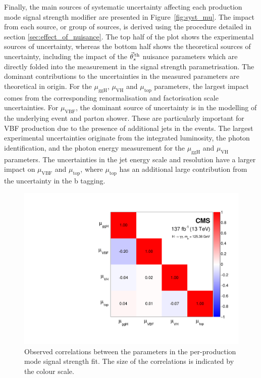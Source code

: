 Finally, the main sources of systematic uncertainty affecting each production mode signal strength modifier are presented in Figure~\ref{fig:syst_mu}. The impact from each source, or group of sources, is derived using the procedure detailed in section \ref{sec:effect_of_nuisance}. The top half of the plot shows the experimental sources of uncertainty, whereas the bottom half shows the theoretical sources of uncertainty, including the impact of the $\vec{\theta}^{\,\rm{th}}_{s}$ nuisance parameters which are directly folded into the measurement in the signal strength parametrisation. The dominant contributions to the uncertainties in the measured parameters are theoretical in origin. For the $\mu_{\text{ggH}}$, $\mu_{\text{VH}}$ and $\mu_{\text{top}}$ parameters, the largest impact comes from the corresponding renormalisation and factorisation scale uncertainties. For $\mu_{\text{VBF}}$, the dominant source of uncertainty is in the modelling of the underlying event and parton shower. These are particularly important for VBF production due to the presence of additional jets in the events. The largest experimental uncertainties originate from the integrated luminosity, the photon identification, and the photon energy measurement for the $\mu_{\text{ggH}}$ and $\mu_{\text{VH}}$ parameters. The uncertainties in the jet energy scale and resolution have a larger impact on $\mu_{\text{VBF}}$ and $\mu_{\text{top}}$, where $\mu_{\text{top}}$ has an additional large contribution from the uncertainty in the b tagging.

\begin{figure}[htb!]
  \centering
  \includegraphics[width=.7\textwidth]{Figures/hgg_results/mu_correlations.pdf}
  \caption[Correlations between per-production mode signal strengths]
  {
    Observed correlations between the parameters in the per-production mode signal strength fit. The size of the correlations is indicated by the colour scale.
  }
  \label{fig:corr_mu}
\end{figure}

